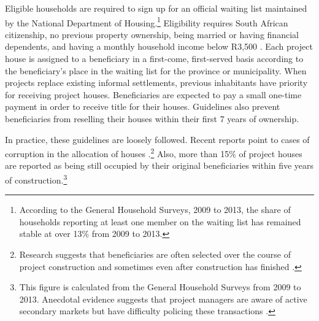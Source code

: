 \documentclass[12pt]{article}
\begin{document}
Eligible households are required to sign up for an official waiting list maintained by the National Department of Housing.\footnote{According to the General Household Surveys, 2009 to 2013, the share of households reporting at least one member on the waiting list has remained stable at over 13\% from 2009 to 2013.}  Eligibility requires South African citizenship, no previous property ownership, being married or having financial dependents, and having a monthly household income below R3,500 \citep{seriq}.  Each project house is assigned to a beneficiary in a first-come, first-served basis according to the beneficiary's place in the waiting list for the province or municipality. When projects replace existing informal settlements, previous inhabitants have priority for receiving project houses.  Beneficiaries are expected to pay a small one-time payment in order to receive title for their houses.  Guidelines also prevent beneficiaries from reselling their houses within their first 7 years of ownership.   %

In practice, these guidelines are loosely followed.  Recent reports point to cases of corruption in the allocation of houses \citep{seriq}.\footnote{Research suggests that beneficiaries are often selected over the course of project construction and sometimes even after construction has finished \citep{seriq}.}  Also, more than 15\% of project houses are reported as being still occupied by their original beneficiaries within five years of construction.\footnote{This figure is calculated from the General Household Surveys from 2009 to 2013. Anecdotal evidence suggests that project managers are aware of active secondary markets but have difficulty policing these transactions \citep{resale}.} 


\end{document}
